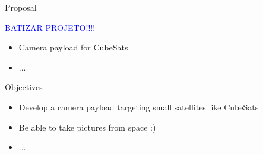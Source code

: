 %
%
%
%
%

%
%
%
%
%

\begin{frame}{Proposal}

\textcolor{blue}{BATIZAR PROJETO!!!!}

    \begin{itemize}
        \item Camera payload for CubeSats
        \item ...
    \end{itemize}

\end{frame}


\begin{frame}{Objectives}

    \begin{itemize}
        \item Develop a camera payload targeting small satellites like CubeSats
        \vspace{0.5cm}
        \item Be able to take pictures from space :)
        \item ...
    \end{itemize}

\end{frame}